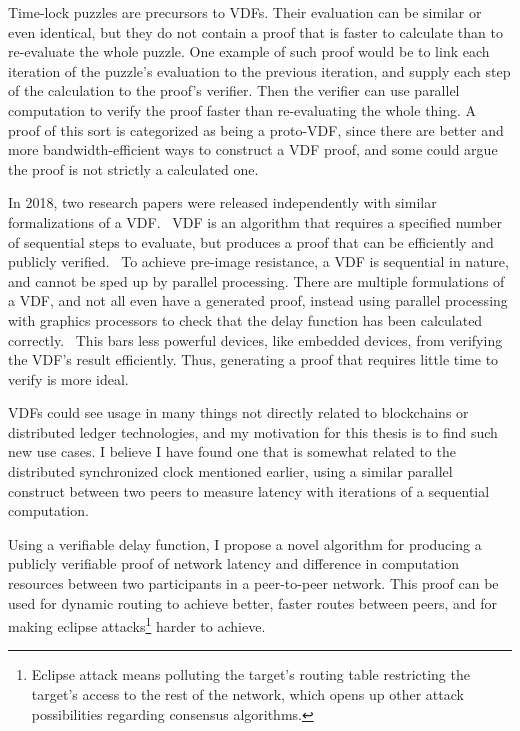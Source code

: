 Time-lock puzzles are precursors to VDFs. Their evaluation can be similar or even identical, but they do not contain a proof that is faster to calculate than to re-evaluate the whole puzzle. One example of such proof would be to link each iteration of the puzzle's evaluation to the previous iteration, and supply each step of the calculation to the proof's verifier. Then the verifier can use parallel computation to verify the proof faster than re-evaluating the whole thing. A proof of this sort is categorized as being a proto-VDF, since there are better and more bandwidth-efficient ways to construct a VDF proof, and some could argue the proof is not strictly a calculated one.

In 2018, two research papers were released independently with similar formalizations of a VDF.~\cite{Wesolowski2018-rf, Pietrzak2018-xs} VDF is an algorithm that requires a specified number of sequential steps to evaluate, but produces a proof that can be efficiently and publicly verified.~\cite{Boneh_undated-ml} To achieve pre-image resistance, a VDF is sequential in nature, and cannot be sped up by parallel processing. There are multiple formulations of a VDF, and not all even have a generated proof, instead using parallel processing with graphics processors to check that the delay function has been calculated correctly.~\cite{Yakovenko2018-zn} This bars less powerful devices, like embedded devices, from verifying the VDF's result efficiently. Thus, generating a proof that requires little time to verify is more ideal.~\cite{Boneh_undated-ml}

VDFs could see usage in many things not directly related to blockchains or distributed ledger technologies, and my motivation for this thesis is to find such new use cases. I believe I have found one that is somewhat related to the distributed synchronized clock mentioned earlier, using a similar parallel construct between two peers to measure latency with iterations of a sequential computation. 

Using a verifiable delay function, I propose a novel algorithm for producing a publicly verifiable proof of network latency and difference in computation resources between two participants in a peer-to-peer network. This proof can be used for dynamic routing to achieve better, faster routes between peers, and for making eclipse attacks\footnote{Eclipse attack means polluting the target's routing table restricting the target's access to the rest of the network, which opens up other attack possibilities regarding consensus algorithms.} harder to achieve. 

